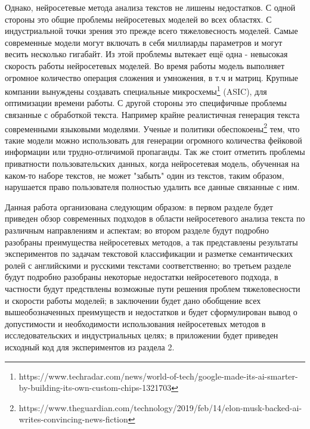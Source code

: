 \par Однако, нейросетевые метода анализа текстов не лишены недостатков. С одной стороны это общие проблемы нейросетевых моделей во всех областях. С индустриальной точки зрения это прежде всего тяжеловесность моделей. Самые современные модели могут включать в себя миллиарды параметров и могут весить несколько гигабайт. Из этой проблемы вытекает ещё одна - невысокая скорость работы нейросетевых моделей. Во время работы модель выполняет огромное количество операция сложения и умножения, в т.ч и матриц. Крупные компании вынуждены создавать специальные микросхемы\footnote{https://www.techradar.com/news/world-of-tech/google-made-its-ai-smarter-by-building-its-own-custom-chips-1321703} (ASIC), для оптимизации времени работы. С другой стороны это специфичные проблемы связанные с обработкой текста. Например крайне реалистичная генерация текста современными языковыми моделями. Ученые и политики обеспокоены\footnote{https://www.theguardian.com/technology/2019/feb/14/elon-musk-backed-ai-writes-convincing-news-fiction} тем, что такие модели можно использовать для генерации огромного количества фейковой информации или трудно-отличимой пропаганды. Так же стоит отметить проблемы приватности пользовательских данных, когда нейросетевая модель, обученная на каком-то наборе текстов, не может "забыть" один из текстов, таким образом, нарушается право пользователя полностью удалить все данные связанные с ним.
\par Данная работа организована следующим образом: в первом разделе будет приведен обзор современных подходов в области нейросетевого анализа текста по различным направлениям и аспектам; во втором разделе будут подробно разобраны преимущества нейросетевых методов, а так представлены результаты экспериментов по задачам текстовой классификации и разметке семантических ролей с английскими и русскими текстами соответственно; во третьем разделе будут подробно разобраны некоторые недостатки нейросетевого подхода, в частности будут предствлены возможные пути решения проблем тяжеловесности и скорости работы моделей; в заключении будет дано обобщение всех вышеобозначенных преимуществ и недостатков и будет сформулирован вывод о допустимости и необходимости использования нейросетевых методов в исследовательских и индустриальных целях; в приложении будет приведен исходный код для экспериментов из раздела 2.

\clearpage
